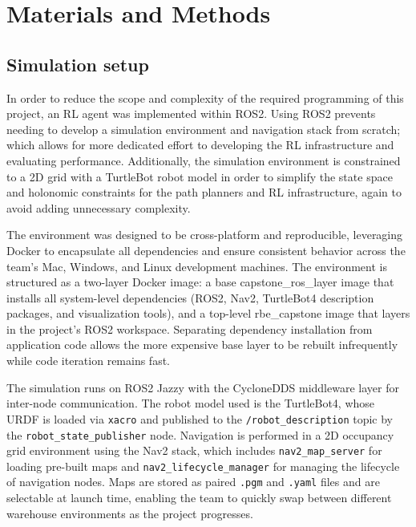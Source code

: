 \documentclass[conference]{IEEEtran}
\begin{document}
\section{Materials and Methods}\label{sec:pq_metrics}
    \subsection{Simulation setup}
    In order to reduce the scope and complexity of the required programming of this project, an RL agent was implemented within ROS2. Using ROS2
    prevents needing to develop a simulation environment and navigation stack from scratch; which allows for more dedicated effort to developing
    the RL infrastructure and evaluating performance. Additionally, the simulation environment is constrained to a 2D grid with a TurtleBot robot
    model in order to simplify the state space and holonomic constraints for the path planners and RL infrastructure, again to avoid adding unnecessary complexity.
    
    The environment was designed to be cross-platform and reproducible, leveraging Docker to encapsulate all dependencies and ensure
    consistent behavior across the team's Mac, Windows, and Linux development machines. The environment is structured as a two-layer Docker image:
    a base capstone\_ros\_layer image that installs all system-level dependencies (ROS2, Nav2, TurtleBot4 description packages, and visualization
    tools), and a top-level rbe\_capstone image that layers in the project's ROS2 workspace. Separating dependency installation from application
    code allows the more expensive base layer to be rebuilt infrequently while code iteration remains fast.

    The simulation runs on ROS2 Jazzy with the CycloneDDS middleware layer for inter-node communication. The robot model used is the TurtleBot4,
    whose URDF is loaded via \texttt{xacro} and published to the \texttt{/robot\_description} topic by the \texttt{robot\_state\_publisher} node.
    Navigation is performed in a 2D occupancy grid environment using the Nav2 stack, which includes \texttt{nav2\_map\_server} for loading pre-built
    maps and \texttt{nav2\_lifecycle\_manager} for managing the lifecycle of navigation nodes. Maps are stored as paired \texttt{.pgm} and
    \texttt{.yaml} files and are selectable at launch time, enabling the team to quickly swap between different warehouse environments as the project
    progresses.
\end{document}
